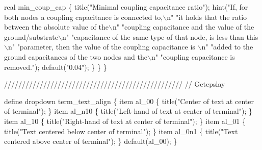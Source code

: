         real min_coup_cap \{
            title("Minimal coupling capacitance ratio");
            hint("If, for both nodes a coupling capacitance is connected to,\(\backslash\)n"
                 "it holds that the ratio between the absolute value of the\(\backslash\)n"
                 "coupling capacitance and the value of the ground/substrate\(\backslash\)n"
                 "capacitance of the same type of that node, is less than this\(\backslash\)n"
                 "parameter, then the value of the coupling capacitance is \(\backslash\)n"
                 "added to the ground capacitances of the two nodes and the\(\backslash\)n"
                 "coupling capacitance is removed.");
            default("0.04");
        \}
    \}
\}

//////////////////////////////////////////////////
// Getepslay

define dropdown term_text_align \{
    item al_00   \{ title("Center of text at center of terminal"); \}
    item al_n10  \{ title("Left-hand of text at center of terminal"); \}
    item al_10   \{ title("Right-hand of text at center of terminal"); \}
    item al_01   \{ title("Text centered below center of terminal"); \}
    item al_0n1  \{ title("Text centered above center of terminal"); \}
    default(al_00);
\}

